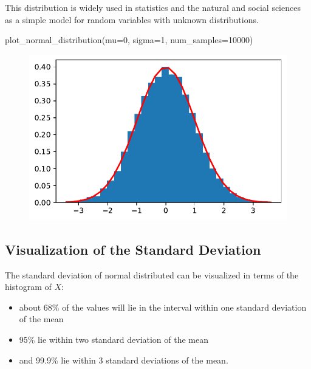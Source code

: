 \documentclass[
  letterpaper,
  DIV=11,
  numbers=noendperiod]{scrreprt}
\newenvironment{Shaded}{\begin{snugshade}}{\end{snugshade}}
\newcommand{\DecValTok}[1]{\textcolor[rgb]{0.68,0.00,0.00}{#1}}
\newcommand{\NormalTok}[1]{\textcolor[rgb]{0.00,0.23,0.31}{#1}}
\newcommand{\OperatorTok}[1]{\textcolor[rgb]{0.37,0.37,0.37}{#1}}
\providecommand{\tightlist}{%
  \setlength{\itemsep}{0pt}\setlength{\parskip}{0pt}}\usepackage{longtable,booktabs,array}
\begin{document}
This distribution is widely used in statistics and the natural and
social sciences as a simple model for random variables with unknown
distributions.

\begin{Shaded}
\begin{Highlighting}[]
\NormalTok{plot\_normal\_distribution(mu}\OperatorTok{=}\DecValTok{0}\NormalTok{, sigma}\OperatorTok{=}\DecValTok{1}\NormalTok{, num\_samples}\OperatorTok{=}\DecValTok{10000}\NormalTok{)}
\end{Highlighting}
\end{Shaded}

\begin{figure}[H]

{\centering \includegraphics{006_num_gp_files/figure-pdf/cell-15-output-1.pdf}

}

\end{figure}

\hypertarget{visualization-of-the-standard-deviation}{%
\subsection{Visualization of the Standard
Deviation}\label{visualization-of-the-standard-deviation}}

The standard deviation of normal distributed can be visualized in terms
of the histogram of \(X\):

\begin{itemize}
\tightlist
\item
  about 68\% of the values will lie in the interval within one standard
  deviation of the mean
\item
  95\% lie within two standard deviation of the mean
\item
  and 99.9\% lie within 3 standard deviations of the mean.
\end{itemize}
\end{document}
